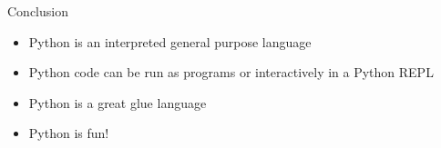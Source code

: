 \documentclass[smaller, aspectratio=1610]{beamer}
\begin{document}
\begin{frame}[label={sec:org15bf693}]{Conclusion}
\begin{itemize}
\item Python is an interpreted general purpose language

\item Python code can be run as programs or interactively in a Python REPL

\item Python is a great glue language

\item Python is fun!
\end{itemize}
\end{frame}
\end{document}
